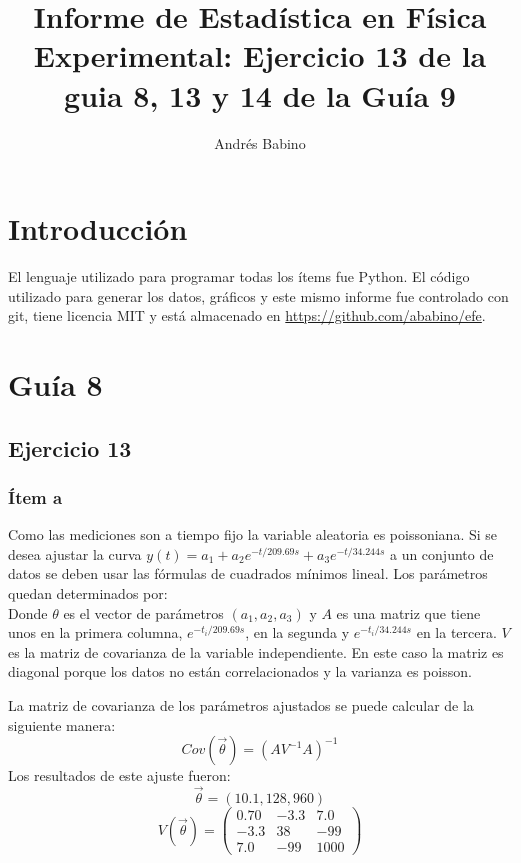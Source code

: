 \title{Informe de Estadística en Física Experimental: Ejercicio 13 de la guia 8,  13 y 14 de la  Guía 9}
\author{Andrés Babino}


\maketitle
\section{Introducción}
El lenguaje utilizado para programar todas los ítems fue Python.
El código utilizado para generar los datos, gráficos y este mismo informe fue controlado con git, tiene licencia MIT y está almacenado en \url{https://github.com/ababino/efe}.

\section*{Guía 8}
\subsection*{Ejercicio 13}
\subsubsection*{Ítem a}
Como las mediciones son a tiempo fijo la variable aleatoria es poissoniana.
Si se desea ajustar la curva $y(t) = a_1 + a_2 e^{-t/209.69s} + a_3 e^{-t/34.244s}$ a un conjunto de datos se deben usar las fórmulas de cuadrados mínimos lineal.
Los parámetros quedan determinados por:
$$
$$
Donde $\theta$ es el vector de parámetros $(a_1, a_2, a_3)$ y $A$ es una matriz que tiene unos en la primera columna, $e^{-t_i/209.69s}$, en la segunda y $e^{-t_i/34.244s}$ en la tercera.
$V$ es la matriz de covarianza de la variable independiente.
En este caso la matriz es diagonal porque los datos no están correlacionados y la varianza es poisson.

La matriz de covarianza de los parámetros ajustados se puede calcular de la siguiente manera:
$$
Cov(\vec{\theta}) = {(AV^{-1}A)}^{-1}
$$
Los resultados de este ajuste fueron:
$$
\vec{\theta} = (10.1, 128, 960)
$$
$$
V(\vec{\theta}) =\left(
\begin{matrix}
0.70 &-3.3 & 7.0 \\
-3.3 & 38 &-99 \\
7.0  & -99 & 1000
\end{matrix} \right)
$$

